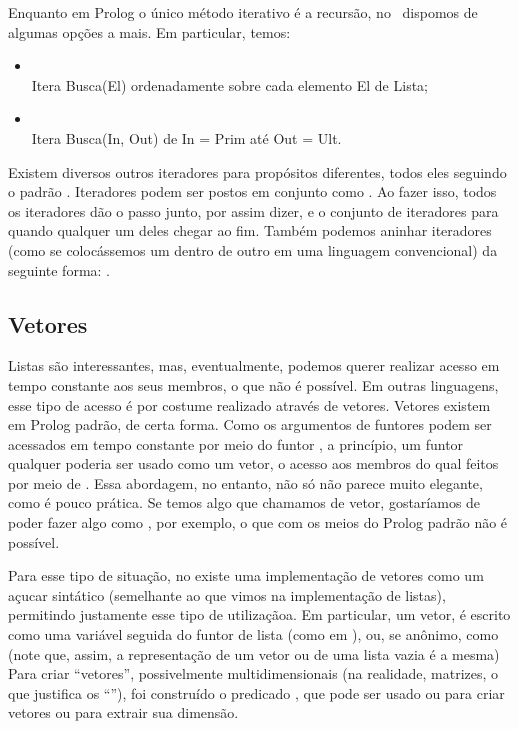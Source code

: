 Enquanto em Prolog o único método iterativo é a recursão, no \eclipse\ dispomos de algumas opções a mais. Em particular, temos:

\begin{itemize}
  \item {}
    \\ Itera Busca(El) ordenadamente sobre cada elemento El de Lista;
  \item {}
    \\ Itera Busca(In, Out) de In = Prim até Out = Ult.
\end{itemize}

Existem diversos outros iteradores para propósitos diferentes, todos eles seguindo o padrão  . Iteradores podem ser postos em conjunto como . Ao fazer isso, todos os iteradores dão o passo junto, por assim dizer, e o conjunto de iteradores para quando qualquer um deles chegar ao fim. Também podemos aninhar iteradores (como se colocássemos um  dentro de outro em uma linguagem
convencional) da seguinte forma: .

\subsection{Vetores}

Listas são interessantes, mas, eventualmente, podemos querer realizar acesso em tempo constante aos
seus membros, o que não é possível. Em outras linguagens, esse tipo de acesso é por costume
realizado através de vetores. Vetores existem em Prolog padrão, de certa forma. Como os argumentos
de funtores podem ser acessados em tempo constante por meio do funtor , a princípio,
um funtor qualquer poderia ser usado como um vetor, o acesso aos membros do qual feitos por meio de
. Essa abordagem, no entanto, não só não parece muito elegante, como é pouco prática.
Se temos algo que chamamos de vetor, gostaríamos de poder fazer algo como , por
exemplo, o que com os meios do Prolog padrão não é possível.

Para esse tipo de situação, no \eclipse existe uma implementação de vetores como um açucar
sintático (semelhante ao que vimos na implementação de listas), permitindo justamente esse tipo de
utilizaçãoa. Em particular, um vetor, é escrito como uma variável seguida do funtor de lista (como
em ), ou, se anônimo, como  (note que, assim, a representação de
um vetor ou de uma lista vazia é a mesma) Para criar ``vetores'', possivelmente multidimensionais
(na realidade, matrizes, o que justifica os ``''), foi construído o predicado , que
pode ser usado ou para criar vetores ou para extrair sua dimensão.



